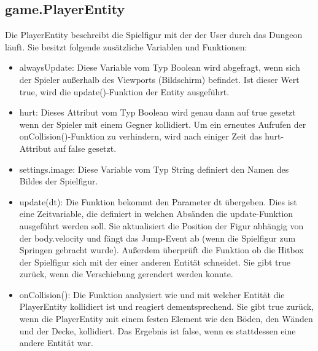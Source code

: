 \subsection{game.PlayerEntity}
\label{PlayerEntity}
Die PlayerEntity beschreibt die Spielfigur mit der der User durch das Dungeon l\"auft. Sie besitzt folgende zus\"atzliche Variablen und Funktionen:
\begin{itemize} 
 	\item alwaysUpdate: Diese Variable vom Typ Boolean wird abgefragt, wenn sich der Spieler au{\ss}erhalb des Viewports (Bildschirm) befindet. 
		Ist dieser Wert true, wird die update()-Funktion der Entity ausgef\"uhrt.
 	\item hurt: Dieses Attribut vom Typ  Boolean wird genau dann auf true gesetzt wenn der Spieler mit einem Gegner kollidiert. Um ein erneutes Aufrufen 
		der onCollision()-Funktion zu verhindern, wird nach einiger Zeit das hurt-Attribut auf false gesetzt.
 	\item settings.image: Diese Variable vom Typ String definiert den Namen des Bildes der Spielfigur.
  
 	\item update(dt): Die Funktion bekommt den Parameter dt \"ubergeben. Dies ist eine Zeitvariable, die definiert in welchen Abs\"anden die update-Funktion
		 ausgef\"uhrt werden soll. Sie aktualisiert die Position der Figur abh\"angig von der body.velocity und f\"angt das Jump-Event ab (wenn die Spielfigur 
		 zum Springen gebracht wurde). Au{\ss}erdem \"uberpr\"uft die Funktion ob die Hitbox der Spielfigur sich mit der einer anderen Entit\"at schneidet.               
                 Sie gibt true zur\"uck,  wenn die Verschiebung gerendert werden konnte.
               
 	\item onCollision(): Die Funktion analysiert wie und mit welcher Entit\"at die PlayerEntity kollidiert ist und reagiert dementsprechend. Sie gibt true zur\"uck, 
		wenn die PlayerEntity mit einem festen Element wie den B\"oden, den W\"anden und der Decke, kollidiert. Das Ergebnis ist false, wenn es 
		stattdessen eine andere Entit\"at war.
\end{itemize}    

\newpage
